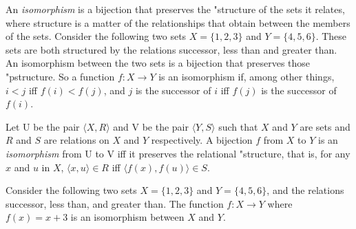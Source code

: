 \documentclass[../../include/open-logic-section]{subfiles}
\begin{document}

\begin{explain}
An \emph{isomorphism} is a bijection that preserves the "{structure} of the sets it relates, where structure is a matter of the relationships that obtain between the members of the sets. Consider the following two sets $X=\{1,2,3\}$ and $Y=\{4,5,6\}$. These sets are both structured by the relations successor, less than and greater than. An isomorphism between the two sets is a bijection that preserves those "p{structure}. So a function $f : X \rightarrow Y$ is an isomorphism if, among other things, $i<j$ iff $f(i)<f(j)$, and $j$ is the successor of $i$ iff $f(j)$ is the successor of $f(i)$.
\end{explain}

\begin{defn}
Let U be the pair $\langle X,R\rangle$ and V be the pair $\langle Y,S\rangle$ such that $X$ and $Y$ are sets and $R$ and $S$ are relations on $X$ and $Y$ respectively. A bijection $f$ from $X$ to $Y$ is an \emph{isomorphism}  from U to V iff it preserves the relational "{structure}, that is, for any $x$ and $u$ in $X$, $\langle x,u\rangle\in R$ iff $\langle f(x),f(u)\rangle\in S$.
\end{defn}

\begin{ex}
Consider the following two sets $X=\{1,2,3\}$ and $Y=\{4,5,6\}$, and the relations successor, less than, and greater than. The function $f: X \rightarrow Y$ where $f(x) = x+3$ is an isomorphism between $X$ and $Y$.
\end{ex}
\end{document}
